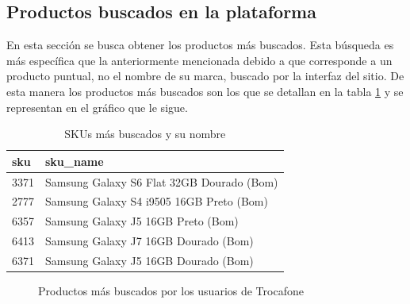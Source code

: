 \documentclass[a4paper]{article}
\begin{document}
\subsection{Productos buscados en la plataforma}

En esta sección se busca obtener los productos más buscados. Esta búsqueda es más específica que la anteriormente mencionada debido a que corresponde a un producto puntual, no el nombre de su marca, buscado por la interfaz del sitio. De esta manera los productos más buscados son los que se detallan en la tabla \ref{table:sencilla} y se representan en el gráfico que le sigue.

\begin{table}[h!]
	\begin{center}
		\begin{tabular}{|l|l|}
			\hline
			sku & sku\_name \\
			\hline \hline
			3371 & Samsung Galaxy S6 Flat 32GB Dourado (Bom) \\ \hline			
			2777 & Samsung Galaxy S4 i9505 16GB Preto (Bom) \\ \hline
			6357 & Samsung Galaxy J5 16GB Preto (Bom) \\ \hline
			6413 & Samsung Galaxy J7 16GB Dourado (Bom) \\ \hline
			6371 & Samsung Galaxy J5 16GB Dourado (Bom) \\ \hline
		\end{tabular}
		\caption{SKUs más buscados y su nombre}
		\label{table:sencilla}
	\end{center}
\end{table}

\begin{figure}[h!]
	\caption{Productos más buscados por los usuarios de Trocafone}
	\label{fig:searchedproduct}
\end{figure}
\end{document}
